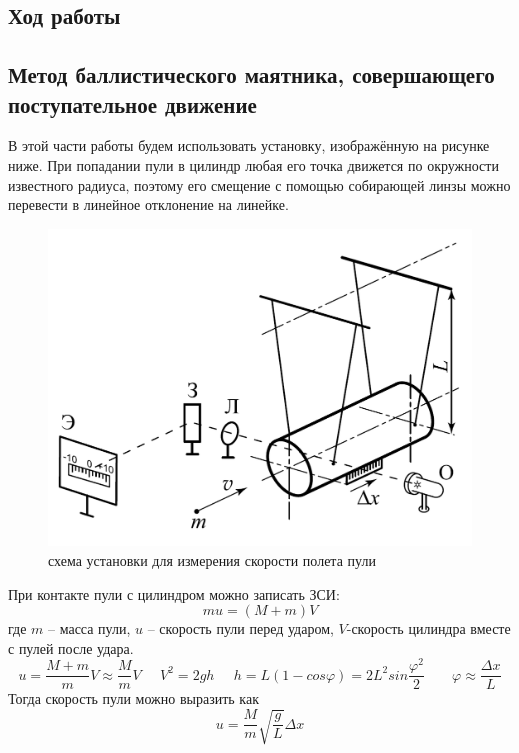 \begin{center}
	\section{Ход работы}
	
	\subsection{Метод баллистического маятника, совершающего поступательное движение}
	В этой части работы будем использовать установку, изображённую на рисунке ниже. При попадании пули в цилиндр любая его точка движется по окружности известного радиуса, поэтому его смещение с помощью собирающей линзы можно перевести в линейное отклонение на линейке.
	
	\begin{figure}[H]
		\begin{center}
			\includegraphics[scale = 0.56]{1.2.1 ustan1}
			\caption{схема установки для измерения скорости полета пули}
		\end{center}
	\end{figure}
	
	При контакте пули с цилиндром можно записать ЗСИ:
	\begin{equation}
		mu = (M+m)V
	\end{equation}
	где $m$ -- масса пули, $u$ -- скорость пули перед ударом, $V$-скорость цилиндра вместе с пулей после удара.
	\begin{equation}
		u=\frac{M+m}{m}V \approx \frac{M}{m}V \;\;\;\;\; V^2=2gh \;\;\;\;\; h = L(1-cos \varphi ) = 2L^2 sin \frac{\varphi^2}{2} \;\;\;\;\;\;\; \varphi \approx \frac{\Delta x}{L} 
	\end{equation}
	Тогда скорость пули можно выразить как
	\begin{equation} \label{vel1}
		u=\frac{M}{m} \sqrt{\frac{g}{L}} \Delta x
	\end{equation}
	

\end{center}
